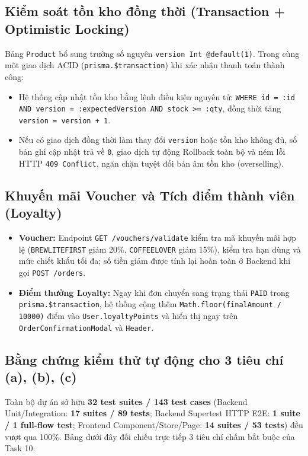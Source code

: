 \documentclass[a4paper,12pt]{article}
\begin{document}
\subsection{Kiểm soát tồn kho đồng thời (Transaction + Optimistic Locking)}
Bảng \texttt{Product} bổ sung trường số nguyên \texttt{version Int @default(1)}. Trong cùng một giao dịch ACID (\texttt{prisma.\$transaction}) khi xác nhận thanh toán thành công:
\begin{itemize}
  \item Hệ thống cập nhật tồn kho bằng lệnh điều kiện nguyên tử: \texttt{WHERE id = :id AND version = :expectedVersion AND stock >= :qty}, đồng thời tăng \texttt{version = version + 1}.
  \item Nếu có giao dịch đồng thời làm thay đổi \texttt{version} hoặc tồn kho không đủ, số bản ghi cập nhật trả về \texttt{0}, giao dịch tự động Rollback toàn bộ và ném lỗi HTTP \texttt{409 Conflict}, ngăn chặn tuyệt đối bán âm tồn kho (overselling).
\end{itemize}

\subsection{Khuyến mãi Voucher và Tích điểm thành viên (Loyalty)}
\begin{itemize}
  \item \textbf{Voucher:} Endpoint \texttt{GET /vouchers/validate} kiểm tra mã khuyến mãi hợp lệ (\texttt{BREWLITEFIRST} giảm 20\%, \texttt{COFFEELOVER} giảm 15\%), kiểm tra hạn dùng và mức chiết khấu tối đa; số tiền giảm được tính lại hoàn toàn ở Backend khi gọi \texttt{POST /orders}.
  \item \textbf{Điểm thưởng Loyalty:} Ngay khi đơn chuyển sang trạng thái \texttt{PAID} trong \texttt{prisma.\$transaction}, hệ thống cộng thêm \texttt{Math.floor(finalAmount / 10000)} điểm vào \texttt{User.loyaltyPoints} và hiển thị ngay trên \texttt{OrderConfirmationModal} và \texttt{Header}.
\end{itemize}

\subsection{Bằng chứng kiểm thử tự động cho 3 tiêu chí (a), (b), (c)}
Toàn bộ dự án sở hữu \textbf{32 test suites / 143 test cases} (Backend Unit/Integration: \textbf{17 suites / 89 tests}; Backend Supertest HTTP E2E: \textbf{1 suite / 1 full-flow test}; Frontend Component/Store/Page: \textbf{14 suites / 53 tests}) đều vượt qua 100\%. Bảng dưới đây đối chiếu trực tiếp 3 tiêu chí chấm bắt buộc của Task 10:
\end{document}
